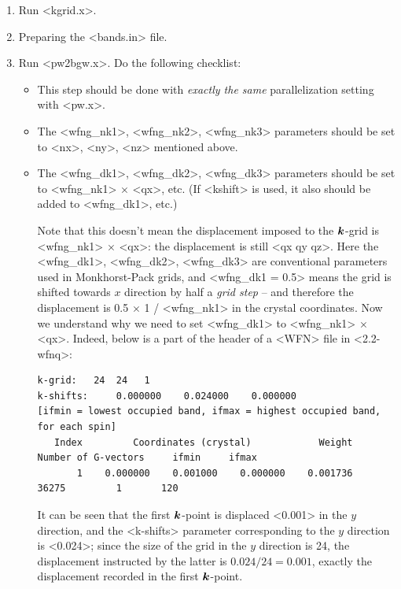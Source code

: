 \documentclass[hyperref, a4paper]{report}
\def\texttt#1{<#1>}%
\newcommand{\shortcode}[1]{\texttt{#1}}
\begin{document}
\begin{enumerate}
\begin{enumerate}
        \item Run \shortcode{kgrid.x}.
        \item Preparing the \shortcode{bands.in} file.
        \item Run \shortcode{pw2bgw.x}. Do the following checklist:
        \begin{itemize}
            \item This step should be done 
            with \emph{exactly the same} parallelization setting with \shortcode{pw.x}.
            \item The \shortcode{wfng_nk1}, \shortcode{wfng_nk2}, \shortcode{wfng_nk3} 
            parameters should be set to \shortcode{nx}, \shortcode{ny}, \shortcode{nz}
            mentioned above.
            \item The \shortcode{wfng_dk1}, \shortcode{wfng_dk2}, \shortcode{wfng_dk3} 
            parameters should be set to \shortcode{wfng_nk1} $\times$ \shortcode{qx}, etc.
            (If \shortcode{kshift} is used, 
            it also should be added to \shortcode{wfng_dk1}, etc.)

            Note that this doesn't mean the displacement imposed to the $\vb*{k}$-grid 
            is \shortcode{wfng_nk1} $\times$ \shortcode{qx}:
            the displacement is still \shortcode{qx qy qz}.
            Here the \shortcode{wfng_dk1}, \shortcode{wfng_dk2}, \shortcode{wfng_dk3} 
            are conventional parameters used in Monkhorst-Pack grids,
            and \shortcode{wfng_dk1 = 0.5} means 
            the grid is shifted towards $x$ direction by half a \emph{grid step}
            -- and therefore the displacement is 0.5 $\times$ 1 /  \shortcode{wfng_nk1}
            in the crystal coordinates.
            Now we understand why we need to set 
            \shortcode{wfng_dk1} to \shortcode{wfng_nk1} $\times$ \shortcode{qx}.
            Indeed, below is a part of the header of a \shortcode{WFN} file in \shortcode{2.2-wfnq}:
            \begin{lstlisting}
k-grid:   24  24   1
k-shifts:     0.000000    0.024000    0.000000
[ifmin = lowest occupied band, ifmax = highest occupied band, for each spin]
   Index         Coordinates (crystal)            Weight   Number of G-vectors     ifmin     ifmax
       1    0.000000    0.001000    0.000000    0.001736                 36275         1       120                
            \end{lstlisting}
            It can be seen that the first $\vb*{k}$-point is displaced \shortcode{0.001}
            in the $y$ direction,
            and the \shortcode{k-shifts} parameter corresponding to the $y$ direction is \shortcode{0.024};
            since the size of the grid in the $y$ direction is 24,
            the displacement instructed by the latter is $0.024 / 24 = 0.001$,
            exactly the displacement recorded in the first $\vb*{k}$-point.
        \end{itemize}
    \end{enumerate} 
\end{enumerate}
\end{document}
